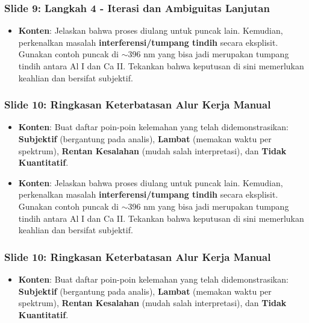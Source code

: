 \documentclass[12pt, a4paper]{article}
\begin{document}
\subsubsection*{Slide 9: Langkah 4 - Iterasi dan Ambiguitas Lanjutan}
\begin{itemize}
    \item \textbf{Konten}: Jelaskan bahwa proses diulang untuk puncak lain. Kemudian, perkenalkan masalah \textbf{interferensi/tumpang tindih} secara eksplisit. Gunakan contoh puncak di $\sim$396 nm yang bisa jadi merupakan tumpang tindih antara Al I dan Ca II. Tekankan bahwa keputusan di sini memerlukan keahlian dan bersifat subjektif.
\end{itemize}

\subsubsection*{Slide 10: Ringkasan Keterbatasan Alur Kerja Manual}
\begin{itemize}
    \item \textbf{Konten}: Buat daftar poin-poin kelemahan yang telah didemonstrasikan: \textbf{Subjektif} (bergantung pada analis), \textbf{Lambat} (memakan waktu per spektrum), \textbf{Rentan Kesalahan} (mudah salah interpretasi), dan \textbf{Tidak Kuantitatif}.
\end{itemize}
\begin{itemize}
    \item \textbf{Konten}: Jelaskan bahwa proses diulang untuk puncak lain. Kemudian, perkenalkan masalah \textbf{interferensi/tumpang tindih} secara eksplisit. Gunakan contoh puncak di $\sim$396 nm yang bisa jadi merupakan tumpang tindih antara Al I dan Ca II. Tekankan bahwa keputusan di sini memerlukan keahlian dan bersifat subjektif.
\end{itemize}

\subsubsection*{Slide 10: Ringkasan Keterbatasan Alur Kerja Manual}
\begin{itemize}
    \item \textbf{Konten}: Buat daftar poin-poin kelemahan yang telah didemonstrasikan: \textbf{Subjektif} (bergantung pada analis), \textbf{Lambat} (memakan waktu per spektrum), \textbf{Rentan Kesalahan} (mudah salah interpretasi), dan \textbf{Tidak Kuantitatif}.
\end{itemize}
\end{document}
